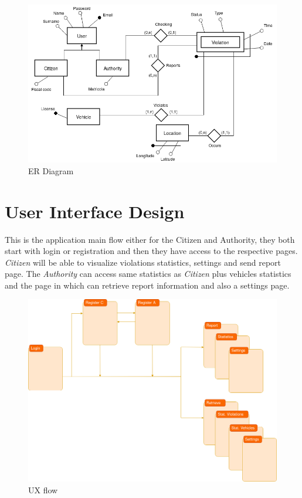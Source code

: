 \documentclass{article}
\begin{document}
\begin{figure}[H]
    \centering
    \includegraphics[scale=0.5]{img/ER_diagram.png}
    \caption{ER Diagram}
\end{figure}

\clearpage

\section{User Interface Design} 
This is the application main flow either for the Citizen and Authority, they both start with login 
or registration and then they have access to the respective pages. \textit{Citizen} will be able to 
visualize violations statistics, settings and send report page. The \textit{Authority} can access 
same statistics as \textit{Citizen} plus vehicles statistics and the page in which can retrieve report 
information and also a settings page.

\begin{figure}[H]
    \centering
    \includegraphics[scale=0.3]{img/UX_flow.png}
    \caption{UX flow}
\end{figure}
\end{document}
